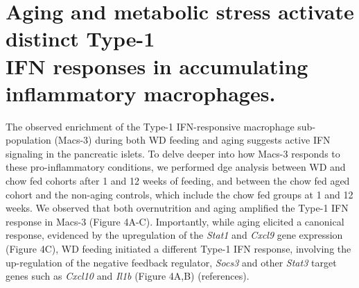 


\section{Aging and metabolic stress activate distinct Type-1\\IFN responses in accumulating inflammatory macrophages.}
\label{sec:endodiff_overview}
The observed enrichment of the Type-1 IFN-responsive macrophage sub-population (Macs-3) during both WD feeding and aging suggests active IFN signaling in the pancreatic islets. To delve deeper into how Macs-3 responds to these pro-inflammatory conditions, we performed \gls{dge} analysis between WD and chow fed cohorts after 1 and 12 weeks of feeding, and between the chow fed aged cohort and the non-aging controls, which include the chow fed groups at 1 and 12 weeks. We observed that both overnutrition and aging amplified the Type-1 IFN response in Macs-3 (Figure 4A-C). Importantly, while aging elicited a canonical response, evidenced by the upregulation of the \textit{Stat1} and \textit{Cxcl9} gene expression (Figure 4C), WD feeding initiated a different Type-1 IFN response, involving the up-regulation of the negative feedback regulator, \textit{Socs3} and other \textit{Stat3} target genes such as \textit{Cxcl10} and \textit{Il1b} (Figure 4A,B) (references).

